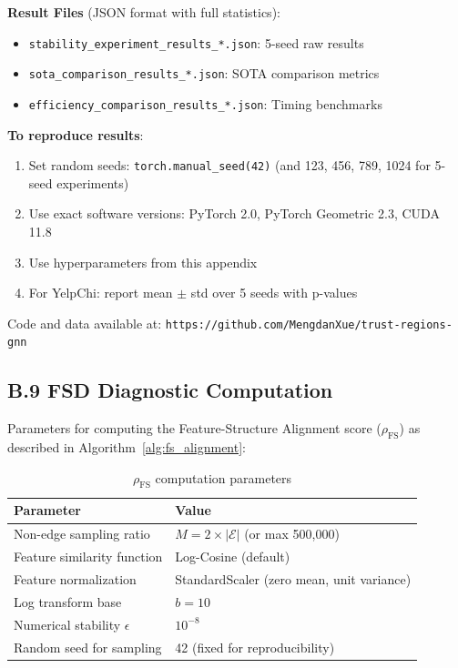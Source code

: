 \textbf{Result Files} (JSON format with full statistics):
\begin{itemize}
\item \texttt{stability\_experiment\_results\_*.json}: 5-seed raw results
\item \texttt{sota\_comparison\_results\_*.json}: SOTA comparison metrics
\item \texttt{efficiency\_comparison\_results\_*.json}: Timing benchmarks
\end{itemize}

\textbf{To reproduce results}:
\begin{enumerate}
\item Set random seeds: \texttt{torch.manual\_seed(42)} (and 123, 456, 789, 1024 for 5-seed experiments)
\item Use exact software versions: PyTorch 2.0, PyTorch Geometric 2.3, CUDA 11.8
\item Use hyperparameters from this appendix
\item For YelpChi: report mean $\pm$ std over 5 seeds with p-values
\end{enumerate}

Code and data available at: \texttt{https://github.com/MengdanXue/trust-regions-gnn}

\subsection*{B.9 FSD Diagnostic Computation}

Parameters for computing the Feature-Structure Alignment score ($\rho_{\text{FS}}$) as described in Algorithm~\ref{alg:fs_alignment}:

\begin{table}[h]
\centering
\small
\begin{tabular}{ll}
\toprule
\textbf{Parameter} & \textbf{Value} \\
\midrule
Non-edge sampling ratio & $M = 2 \times |\mathcal{E}|$ (or max 500,000) \\
Feature similarity function & Log-Cosine (default) \\
Feature normalization & StandardScaler (zero mean, unit variance) \\
Log transform base & $b = 10$ \\
Numerical stability $\epsilon$ & $10^{-8}$ \\
Random seed for sampling & 42 (fixed for reproducibility) \\
\bottomrule
\end{tabular}
\caption{$\rho_{\text{FS}}$ computation parameters}
\end{table}

